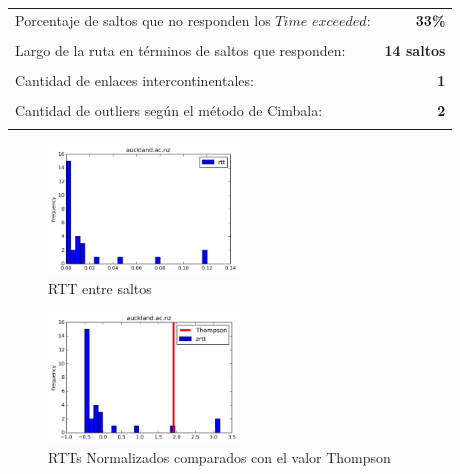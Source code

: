 \begin{center}
\begin{tabular}{p{6.5cm}r}
Porcentaje de saltos que no responden los $Time$ $exceeded$: & \textbf{33\%} \\ \\ 
Largo de la ruta en términos de saltos que responden: &\textbf{14 saltos} \\ \\
Cantidad de enlaces intercontinentales: & \textbf{1} \\ \\
Cantidad de outliers según el método de Cimbala: & \textbf{2} \\ \\
\end{tabular}
\end{center}

\begin{figure}[H]
  \centering
    \includegraphics[width=0.45\textwidth]{histogramas_rtt/auckland-ac-nz.png}
  \caption{RTT entre saltos}
  \label{entropia-s}
\end{figure}

\begin{center}

\end{center}

\begin{figure}[H]
  \centering
    \includegraphics[width=0.45\textwidth]{histogramas_thompson/auckland-ac-nz.png}
  \caption{RTTs Normalizados comparados con el valor Thompson}
  \label{entropia-s}
\end{figure}


